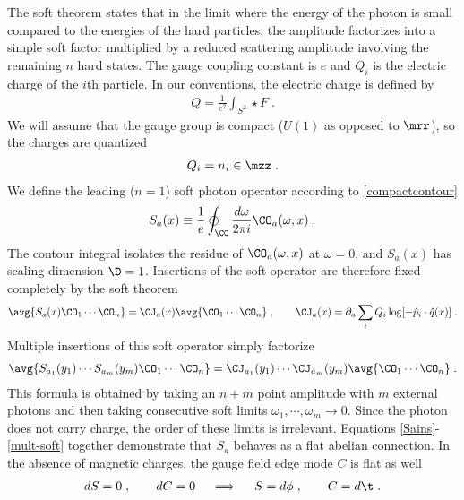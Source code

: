 \documentclass[11pt]{article}
\def\o{{\omega}}
\def\p{{\partial}}
\begin{document}
The soft theorem states that in the limit where the energy of the photon is small compared to the energies of the hard particles, the amplitude factorizes into a simple soft factor multiplied by a reduced scattering amplitude involving the remaining $n$ hard states. The gauge coupling constant is $e$ and $Q_i$ is the electric charge of the $i$th particle. In our conventions, the electric charge is defined by
\begin{equation}
\begin{split}
Q = \frac{1}{e^2}  \int_{S^2} \star F \;.
\end{split}
\end{equation}
We will assume that the gauge group is compact  ($U(1)$ as opposed to $\mrr$), so the charges are quantized
\begin{equation}
\begin{split}\label{el-chargequant}
Q_i = n_i \in \mzz \;  . 
\end{split}
\end{equation}
We define the leading ($n=1$) soft photon operator according to \eqref{compactcontour}
\begin{equation}\label{Sdef}
S_a(x) \equiv \frac{1}{e} \oint_\CC \frac{d\o}{2\pi i}  \CO_a(\o,x) \;  .
\end{equation}
 The contour integral isolates the residue of $\CO_a(\o,x)$ at $\o = 0$, and $S_a(x)$ has scaling dimension $\D=1$. Insertions of the soft operator are therefore fixed completely by the soft theorem 
\begin{equation}
\begin{split}\label{Sains}
\avg{ S_a(x) \CO_1 \cdots \CO_n } = \CJ_a (x) \avg{ \CO_1 \cdots \CO_n  } \;  ,  \qquad \CJ_a (x) = \p_a \sum_i Q_i \log [ - {\hat p}_i \cdot {\hat q}(x) ] \;  .
\end{split}
\end{equation}
Multiple insertions of this soft operator simply factorize
\begin{equation}
\begin{split}\label{mult-soft}
\avg{ S_{a_1}(y_1) \cdots S_{a_m}(y_m) \CO_1 \cdots \CO_n } = \CJ_{a_1}(y_1) \cdots \CJ_{a_m}(y_m) \avg{ \CO_1 \cdots \CO_n } \;  . 
\end{split}
\end{equation}
This formula is obtained by taking an $n+m$ point amplitude with $m$ external photons and then taking consecutive soft limits $\o_1,\cdots , \o_m \to 0$. Since the photon does not carry charge, the order of these limits is irrelevant.
Equations \eqref{Sains}-\eqref{mult-soft} together demonstrate that $S_a$ behaves as a flat abelian connection. 
In the absence of magnetic charges, the gauge field edge mode $C$ is flat as well 
\begin{equation}
\begin{split}
\label{eq:FlatAbelian}
d S = 0  \; , \qquad d C = 0 \quad \implies \quad S = d \phi \; , \qquad C = d \t \;. 
\end{split}
\end{equation}
\end{document}
